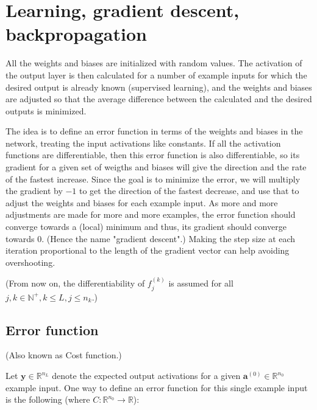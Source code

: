 \documentclass{article}
\begin{document}
  \section{Learning, gradient descent, backpropagation}

    All the weights and biases are initialized with random values. The
    activation of the output layer is then calculated for a number of example
    inputs for which the desired output is already known (supervised learning),
    and the weights and biases are adjusted so that the average difference
    between the calculated and the desired outputs is minimized.

    The idea is to define an error function in terms of the weights and biases
    in the network, treating the input activations like constants. If all the
    activation functions are differentiable, then this error function is also
    differentiable, so its gradient for a given set of weigths and biases will
    give the direction and the rate of the fastest increase. Since the goal is
    to minimize the error, we will multiply the gradient by $-1$ to get the
    direction of the fastest decrease, and use that to adjust the weights and
    biases for each example input. As more and more adjustments are made for
    more and more examples, the error function should converge towards a
    (local) minimum and thus, its gradient should converge towards $0$. (Hence
    the name "gradient descent".) Making the step size at each iteration
    proportional to the length of the gradient vector can help avoiding
    overshooting.

    (From now on, the differentiability of $f_j^{(k)}$ is assumed for all
    $j, k \in \mathbb{N}^+, k \leq L, j \leq n_k$.)

    \subsection{Error function}

      (Also known as Cost function.)

      Let $\mathbf{y} \in \mathbb{R}^{n_L}$ denote the expected output
      activations for a given $\mathbf{a}^{(0)} \in \mathbb{R}^{n_0}$ example
      input. One way to define an error function for this single example input
      is the following (where $C : \mathbb{R}^{n_0} \rightarrow \mathbb{R}$):
\end{document}
